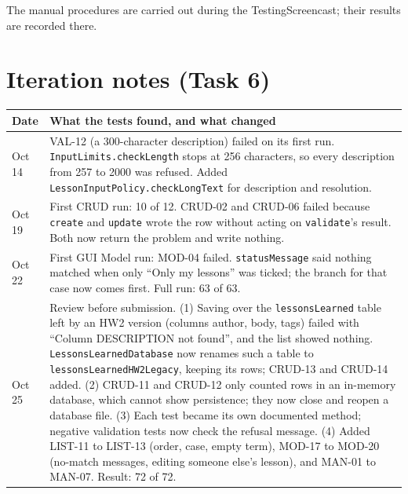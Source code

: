 \documentclass[10pt]{article}
\begin{document}
The manual procedures are carried out during the TestingScreencast; their results are recorded
there.

\section*{Iteration notes (Task 6)}
\begin{tabularx}{\linewidth}{@{}l X@{}}
\toprule
\textbf{Date} & \textbf{What the tests found, and what changed} \\
\midrule
Oct 14 & VAL-12 (a 300-character description) failed on its first run. \texttt{InputLimits.checkLength}
  stops at 256 characters, so every description from 257 to 2000 was refused. Added
  \texttt{LessonInputPolicy.checkLongText} for description and resolution. \\
Oct 19 & First CRUD run: 10 of 12. CRUD-02 and CRUD-06 failed because \texttt{create} and \texttt{update}
  wrote the row without acting on \texttt{validate}'s result. Both now return the problem and write
  nothing. \\
Oct 22 & First GUI Model run: MOD-04 failed. \texttt{statusMessage} said nothing matched when only
  ``Only my lessons'' was ticked; the branch for that case now comes first. Full run: 63 of 63. \\
Oct 25 & Review before submission. (1) Saving over the \texttt{lessonsLearned} table left by an HW2
  version (columns author, body, tags) failed with ``Column DESCRIPTION not found'', and the list
  showed nothing. \texttt{LessonsLearnedDatabase} now renames such a table to
  \texttt{lessonsLearnedHW2Legacy}, keeping its rows; CRUD-13 and CRUD-14 added. (2) CRUD-11 and
  CRUD-12 only counted rows in an in-memory database, which cannot show persistence; they now close
  and reopen a database file. (3) Each test became its own documented method; negative validation
  tests now check the refusal message. (4) Added LIST-11 to LIST-13 (order, case, empty term),
  MOD-17 to MOD-20 (no-match messages, editing someone else's lesson), and MAN-01 to MAN-07.
  Result: 72 of 72. \\
\bottomrule
\end{tabularx}
\end{document}
